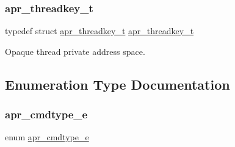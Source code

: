 \subsubsection{\texorpdfstring{apr\+\_\+threadkey\+\_\+t}{apr\_threadkey\_t}}
{\footnotesize\ttfamily typedef struct \mbox{\hyperlink{structapr__threadkey__t}{apr\+\_\+threadkey\+\_\+t}} \mbox{\hyperlink{structapr__threadkey__t}{apr\+\_\+threadkey\+\_\+t}}}

Opaque thread private address space. 

\subsection{Enumeration Type Documentation}
\mbox{\label{group__apr__thread__proc_gadcb981d7748c580eb69ac11dbf709060}} 
\subsubsection{\texorpdfstring{apr\+\_\+cmdtype\+\_\+e}{apr\_cmdtype\_e}}
{\footnotesize\ttfamily enum \mbox{\hyperlink{group__apr__thread__proc_gadcb981d7748c580eb69ac11dbf709060}{apr\+\_\+cmdtype\+\_\+e}}}

